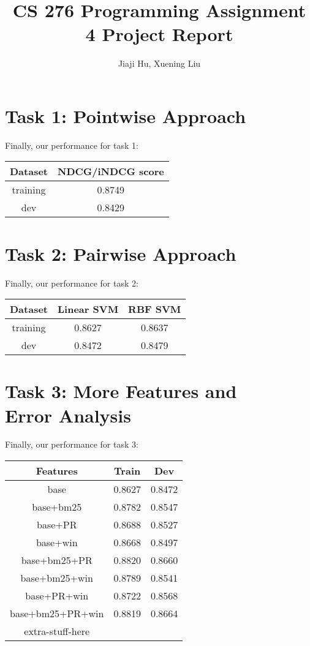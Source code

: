 \documentclass[10pt,twocolumn]{article}
\begin{document}
\title{CS 276 Programming Assignment 4 Project Report}
\author{Jiaji Hu, Xuening Liu}
\date{}
\maketitle

\section*{Task 1: Pointwise Approach}
Finally, our performance for task 1:
\begin{table}[H]
\centering
\begin{tabular}{|c|c|}
\hline
Dataset & NDCG/iNDCG score \\\hline
training & 0.8749\\\hline
dev & 0.8429\\\hline
\end{tabular}
\end{table}

\section*{Task 2: Pairwise Approach}
Finally, our performance for task 2:
\begin{table}[H]
\centering
\begin{tabular}{|c|c|c|}
\hline
Dataset & Linear SVM & RBF SVM \\\hline
training & 0.8627 & 0.8637 \\\hline
dev & 0.8472 & 0.8479\\\hline
\end{tabular}
\end{table}

\section*{Task 3: More Features and \\Error Analysis}
Finally, our performance for task 3:
\begin{table}[H]
\centering
\begin{tabular}{|c|c|c|}
\hline
Features &Train& Dev \\\hline
base & 0.8627 & 0.8472\\\hline
base+bm25 & 0.8782 & 0.8547\\\hline
base+PR & 0.8688 & 0.8527\\\hline
base+win & 0.8668 & 0.8497\\\hline
base+bm25+PR & 0.8820 & 0.8660\\\hline
base+bm25+win & 0.8789 & 0.8541\\\hline
base+PR+win & 0.8722 & 0.8568\\\hline
base+bm25+PR+win & 0.8819 & 0.8664\\\hline
extra-stuff-here & & \\\hline
\end{tabular}
\end{table}
\end{document}
